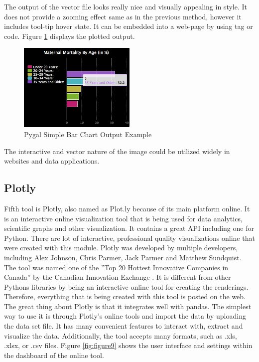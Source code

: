 \documentclass[sigconf]{acmart}
\begin{document}
The output of the vector file looks really nice and visually appealing in style. It does not provide a zooming effect same as in the previous method, however it includes tool-tip hover state. It can be embedded into a web-page by using tag or code. Figure \ref{fig:figure8} displays the plotted output. 

\begin{figure}
  \centering
  \includegraphics[width=0.5\textwidth]{images/output_5_0.png}
  \caption{Pygal Simple Bar Chart Output Example \cite{md}} \label{fig:figure8} 
\end{figure}

The interactive and vector nature of the image could be utilized widely in websites and data applications. 


\subsection{Plotly}

Fifth tool is Plotly, also named as Plot.ly because of its main platform online. It is an interactive online visualization tool that is being used for data analytics, scientific graphs and other visualization. It contains a great API including one for Python. There are lot of interactive, professional quality visualizations online that were created with this module.
Plotly was developed by multiple developers, including Alex Johnson, Chris Parmer, Jack Parmer and Matthew Sundquist. The tool was named one of the ''Top 20 Hottest Innovative Companies in Canada'' by the Canadian Innovation Exchange \cite{canada}.
It is different from other Python\textquotesingle s libraries by being an interactive online tool for creating the renderings. Therefore, everything that is being created with this tool is posted on the web. The great thing about Plotly is that it integrates well with pandas.
The simplest way to use it is through Plotly’s online tools and import the data by uploading the data set file. It has many convenient features to interact with, extract and visualize the data. Additionally, the tool accepts many formats, such as .xls, .xlsx, or .csv files\cite{adams2014learning}.
Figure \ref{fig:figure9} shows the user interface and settings within the dashboard of the online tool.
\end{document}
